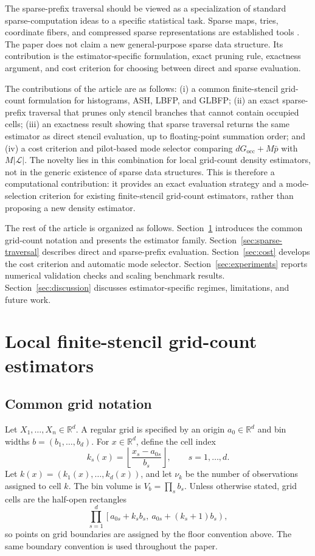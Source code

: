 \documentclass[pdflatex,sn-mathphys-ay]{sn-jnl}
\theoremstyle{thmstyleone}
\newcommand{\stencil}{\mathcal{L}}
\begin{document}
The sparse-prefix traversal should be viewed as a specialization of standard sparse-computation ideas to a specific statistical task. Sparse maps, tries, coordinate fibers, and compressed sparse representations are established tools \citep{Fredkin1960Trie,BaderKolda2007SparseTensor,KoldaBader2009TensorReview}. The paper does not claim a new general-purpose sparse data structure. Its contribution is the estimator-specific formulation, exact pruning rule, exactness argument, and cost criterion for choosing between direct and sparse evaluation.

The contributions of the article are as follows: (i) a common finite-stencil grid-count formulation for histograms, ASH, LBFP, and GLBFP; (ii) an exact sparse-prefix traversal that prunes only stencil branches that cannot contain occupied cells; (iii) an exactness result showing that sparse traversal returns the same estimator as direct stencil evaluation, up to floating-point summation order; and (iv) a cost criterion and pilot-based mode selector comparing \(dG_{\mathrm{occ}}+M\bar p\) with \(M|\stencil|\). The novelty lies in this combination for local grid-count density estimators, not in the generic existence of sparse data structures. This is therefore a computational contribution: it provides an exact evaluation strategy and a mode-selection criterion for existing finite-stencil grid-count estimators, rather than proposing a new density estimator.

The rest of the article is organized as follows. Section~\ref{sec:grid-estimators} introduces the common grid-count notation and presents the estimator family. Section~\ref{sec:sparse-traversal} describes direct and sparse-prefix evaluation. Section~\ref{sec:cost} develops the cost criterion and automatic mode selector. Section~\ref{sec:experiments} reports numerical validation checks and scaling benchmark results. Section~\ref{sec:discussion} discusses estimator-specific regimes, limitations, and future work.

\section{Local finite-stencil grid-count estimators}
\label{sec:grid-estimators}

\subsection{Common grid notation}

Let \(X_1,\ldots,X_n\in\mathbb{R}^d\). A regular grid is specified by an origin \(a_0\in\mathbb{R}^d\) and bin widths \(b=(b_1,\ldots,b_d)\). For \(x\in\mathbb{R}^d\), define the cell index
\[
k_s(x)
=
\left\lfloor
\frac{x_s-a_{0s}}{b_s}
\right\rfloor,
\qquad s=1,\ldots,d.
\]
Let \(k(x)=(k_1(x),\ldots,k_d(x))\), and let \(\nu_k\) be the number of observations assigned to cell \(k\). The bin volume is \(V_b=\prod_s b_s\).
Unless otherwise stated, grid cells are the half-open rectangles
\[
\prod_{s=1}^d
\left[a_{0s}+k_sb_s,\ a_{0s}+(k_s+1)b_s\right),
\]
so points on grid boundaries are assigned by the floor convention above. The same boundary convention is used throughout the paper.
\end{document}

